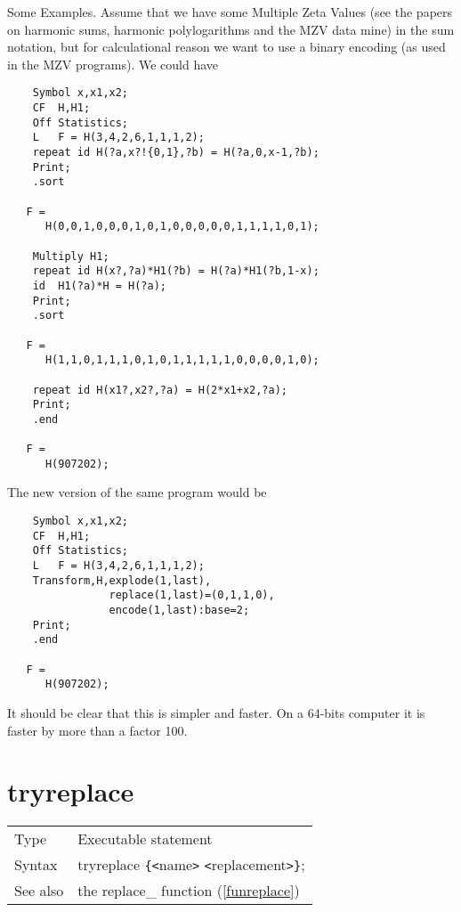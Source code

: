 Some Examples. Assume that we have some Multiple Zeta Values (see the papers on harmonic sums, harmonic polylogarithms and the MZV 
data mine) in the sum notation, but for calculational 
reason we want to use a binary encoding (as used in the MZV programs). We 
could have

\begin{verbatim}
    Symbol x,x1,x2;
    CF  H,H1;
    Off Statistics;
    L   F = H(3,4,2,6,1,1,1,2);
    repeat id H(?a,x?!{0,1},?b) = H(?a,0,x-1,?b);
    Print;
    .sort

   F =
      H(0,0,1,0,0,0,1,0,1,0,0,0,0,0,1,1,1,1,0,1);

    Multiply H1;
    repeat id H(x?,?a)*H1(?b) = H(?a)*H1(?b,1-x);
    id  H1(?a)*H = H(?a);
    Print;
    .sort

   F =
      H(1,1,0,1,1,1,0,1,0,1,1,1,1,1,0,0,0,0,1,0);

    repeat id H(x1?,x2?,?a) = H(2*x1+x2,?a);
    Print;
    .end

   F =
      H(907202);
\end{verbatim}
The new version of the same program would be
\begin{verbatim}
    Symbol x,x1,x2;
    CF  H,H1;
    Off Statistics;
    L   F = H(3,4,2,6,1,1,1,2);
    Transform,H,explode(1,last),
                replace(1,last)=(0,1,1,0),
                encode(1,last):base=2;
    Print;
    .end

   F =
      H(907202);
\end{verbatim}
It should be clear that this is simpler and faster. On a 64-bits computer 
it is faster by more than a factor 100.

\vspace{10mm}


\section{tryreplace}
\label{substatryreplace}

\noindent \begin{tabular}{ll}
Type & Executable statement\\
Syntax & tryreplace \verb:{:{\tt<}name{\tt>} {\tt<}replacement{\tt>}\verb:}:;
\\ See also & the replace\_ function (\ref{funreplace})
\end{tabular} \vspace{4mm}

